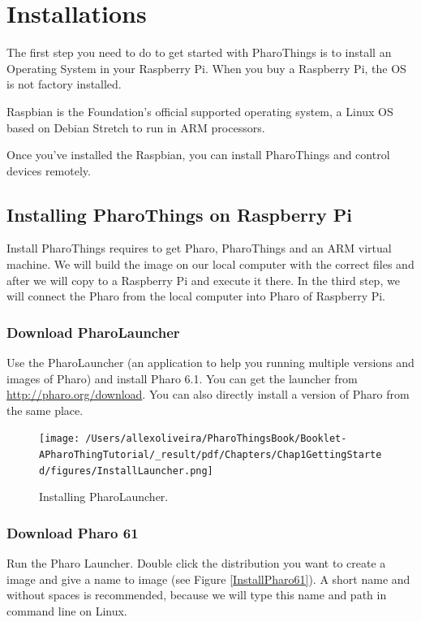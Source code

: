 \documentclass[10pt,twoside,english]{_support/latex/sbabook/sbabook}
\begin{document}
\frontmatter
\pagestyle{plain}

\tableofcontents*
\clearpage\listoffigures

\mainmatter

\chapter{Installations }
The first step you need to do to get started with PharoThings is to install an Operating System in your Raspberry Pi. When you buy a Raspberry Pi, the OS is not factory installed.

Raspbian is the Foundation’s official supported operating system, a Linux OS based on Debian Stretch to run in ARM processors.

Once you've installed the Raspbian, you can install PharoThings and control devices remotely. 
\section{Installing PharoThings on Raspberry Pi}
Install PharoThings requires to get Pharo, PharoThings and an ARM virtual machine. We will build the image on our local computer with the correct files and after we will copy to a Raspberry Pi and execute it there. In the third step, we will connect the Pharo from the local computer into Pharo of Raspberry Pi.
\subsection{Download PharoLauncher}
Use the PharoLauncher (an application to help you running multiple versions and images of Pharo) and install Pharo 6.1. You can get the launcher from \url{http://pharo.org/download}.
You can also directly install a version of Pharo from the same place.


\begin{figure}

\begin{center}
\texttt{[image: /Users/allexoliveira/PharoThingsBook/Booklet-APharoThingTutorial/\_result/pdf/Chapters/Chap1GettingStarted/figures/InstallLauncher.png]}\caption{Installing PharoLauncher.\label{installLauncher}}\end{center}
\end{figure}

\subsection{Download Pharo 61}
Run the Pharo Launcher. Double click the distribution you want to create a image and give a name to image (see Figure \ref{InstallPharo61}). A short name and without spaces is recommended, because we will type this name and path in command line on Linux. 
\end{document}
